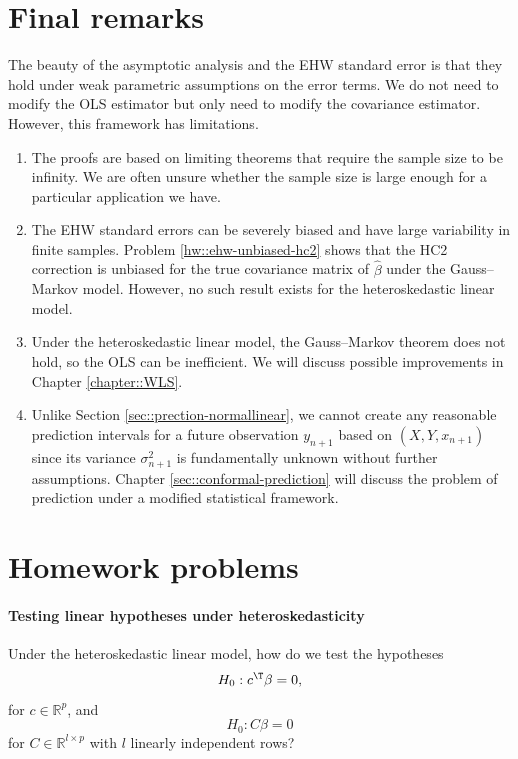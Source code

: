 \section{Final remarks}

The beauty of the asymptotic analysis and the EHW standard error is that they hold under weak parametric assumptions on the error terms. We do not need to modify the OLS estimator but only need to modify the covariance estimator. 
However, this framework has limitations. 
\begin{enumerate}[label=(L\arabic*), ref=L\arabic*]
\item
The proofs are based on limiting theorems that require the sample size to be infinity. We are often unsure whether the sample size is large enough for a particular application we have.
\item
The EHW standard errors can be severely biased and have large variability in finite samples. Problem \ref{hw::ehw-unbiased-hc2} shows that the HC2 correction is unbiased for the true covariance matrix of $\hat\beta$ under the Gauss--Markov model. However, no such result exists for the heteroskedastic linear model.
\item
Under the heteroskedastic linear model, the Gauss--Markov theorem does not hold, so the OLS can be inefficient. We will discuss possible improvements in Chapter \ref{chapter::WLS}. 
\item
Unlike Section \ref{sec::prection-normallinear}, we cannot create any reasonable prediction intervals for a future observation $y_{n+1}$ based on $(X,Y, x_{n+1})$ since its variance $\sigma_{n+1}^2$ is fundamentally unknown without further assumptions.  Chapter \ref{sec::conformal-prediction} will discuss the problem of prediction under a modified statistical framework. 
\end{enumerate}






\section{Homework problems}

\paragraph{Testing linear hypotheses under heteroskedasticity} Under the heteroskedastic linear model, how do we test the hypotheses
$$
H_0: c^{\T} \beta = 0,  
$$
for $c\in \mathbb{R}^p$,
and
$$
H_0:  C\beta = 0
$$
for $ C\in \mathbb{R}^{l\times p}$ with $l$ linearly independent rows?



